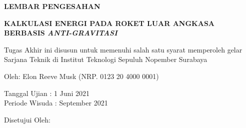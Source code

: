 \begin{center}
	\large\textbf{LEMBAR PENGESAHAN}
\end{center}

\thispagestyle{empty}

\begin{center}
  \textbf{KALKULASI ENERGI PADA ROKET LUAR ANGKASA BERBASIS \emph{ANTI-GRAVITASI}}
\end{center}

\begingroup
  \small

  \begin{center}
    Tugas Akhir ini disusun untuk memenuhi salah satu syarat memperoleh gelar Sarjana Teknik di Institut Teknologi Sepuluh Nopember Surabaya
  \end{center}

  \begin{center}
    Oleh: Elon Reeve Musk (NRP. 0123 20 4000 0001)
  \end{center}

  \begin{center}
    Tanggal Ujian : 1 Juni 2021\\
    Periode Wisuda : September 2021
  \end{center}

  \begin{center}
    Disetujui Oleh:
  \end{center}

